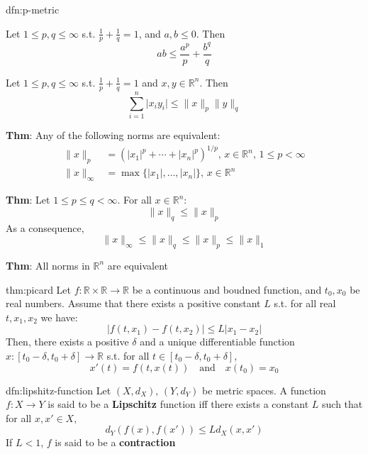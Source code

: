 \documentclass[landscape, 8pt]{extarticle}
\begin{document}
\begin{multicols}{3}
\begin{thm}{dfn:p-metric}{}
    
    Let $1 \le p, q \le \infty$ s.t. $\frac{1}{p} + \frac{1}{q} = 1$, and $a, b\le 0$. Then
    \[ab \le \frac{a^{p}}{p} + \frac{b^{q}}{q}\]


    Let $1 \le p, q \le \infty$ s.t. $\frac{1}{p} + \frac{1}{q} = 1$ and $x, y\in \mathbb{R}^{n}$. Then
    \[\sum_{i = 1}^{n} \lvert x_{i}y_{i} \rvert \le \lVert x \rVert_{p} \lVert y \rVert_{q}\]

    
    \textbf{Thm}: Any of the following norms are equivalent:
    \begin{align*}
        \lVert x \rVert_{p} &= (\lvert x_{1} \rvert^{p} + \cdots + \lvert x_{n} \rvert^{p})^{1 /p},\,x\in \mathbb{R}^{n},\, 1\le p < \infty\\
        \lVert x \rVert_{\infty} &= \max \{\lvert x_{1} \rvert,\dots,\lvert x_{n} \rvert\},\,x\in\mathbb{R}^{n}
    \end{align*}

    \textbf{Thm}: Let $1 \le p \le q < \infty$. For all $x\in\mathbb{R}^{n}$:
    \[\lVert x \rVert_{q} \le \lVert x \rVert_{p}\]
    As a consequence,
    \[\lVert x \rVert_{\infty} \le \lVert x \rVert_{q} \le \lVert x \rVert_{p} \le \lVert x \rVert_{1}\]

    \textbf{Thm}: All norms in $\mathbb{R}^{n}$ are equivalent
\end{thm}

\begin{thm}{thm:picard}{}
    Let $f : \mathbb{R} \times \mathbb{R} \to \mathbb{R}$ be a continuous and boudned function, and $t_{0}, x_{0}$ be real numbers. Assume that there exists a positive constant $L$ s.t. for all real $t, x_{1}, x_{2}$ we have:
    \[\lvert f(t, x_{1}) - f(t, x_{2}) \rvert \le L\lvert x_{1} - x_{2} \rvert\]
    Then, there exists a positive $\delta$ and a unique differentiable function $x : [t_{0} - \delta, t_{0} + \delta]\to \mathbb{R}$ s.t. for all $t\in [t_{0}-\delta, t_{0} + \delta]$,
    \[x'(t) = f(t, x(t)) \quad \text{and} \quad x(t_{0}) = x_{0}\]
\end{thm}


\begin{dfn}{dfn:lipshitz-function}{}
    Let $(X, d_{X}),\,(Y, d_{Y})$ be metric spaces. A function $f : X \to Y$ is said to be a \textbf{Lipschitz} function iff there exists a constant $L$ such that for all $x,x'\in X$,
    \[d_{Y}(f(x), f(x')) \le L d_{X}(x,x')\]
    If $L < 1$, $f$ is said to be a \textbf{contraction}
    

\end{dfn}
\end{multicols}
\end{document}
